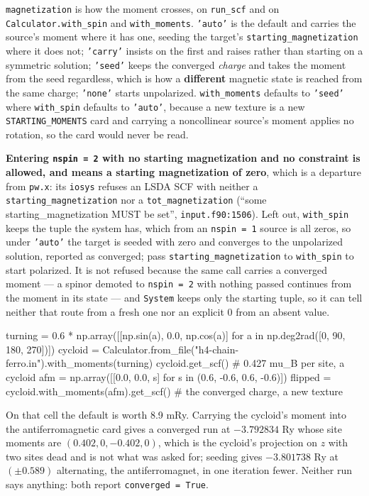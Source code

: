 \documentclass[11pt,a4paper]{article}
\newcommand{\code}[1]{\texttt{\small #1}}
\begin{document}
\code{magnetization} is how the moment crosses, on \code{run\_scf} and on
\code{Calculator.with\_spin} and \code{with\_moments}. \code{'auto'} is the
default and carries the source's moment where it has one, seeding the target's
\code{starting\_magnetization} where it does not; \code{'carry'} insists on
the first and raises rather than starting on a symmetric solution;
\code{'seed'} keeps the converged \emph{charge} and takes the moment from the
seed regardless, which is how a \textbf{different} magnetic state is reached
from the same charge; \code{'none'} starts unpolarized. \code{with\_moments}
defaults to \code{'seed'} where \code{with\_spin} defaults to \code{'auto'},
because a new texture is a new \code{STARTING\_MOMENTS} card and carrying a
noncollinear source's moment applies no rotation, so the card would never be
read.

\textbf{Entering \code{nspin = 2} with no starting magnetization and no
constraint is allowed, and means a starting magnetization of zero}, which is a
departure from \code{pw.x}: its \code{iosys} refuses an LSDA SCF with neither a
\code{starting\_magnetization} nor a \code{tot\_magnetization} (``some
starting\_magnetization MUST be set'', \code{input.f90:1506}). Left out,
\code{with\_spin} keeps the tuple the system has, which from an \code{nspin = 1}
source is all zeros, so under \code{'auto'} the target is seeded with zero and
converges to the unpolarized solution, reported as converged; pass
\code{starting\_magnetization} to \code{with\_spin} to start polarized. It is not
refused because the same call carries a converged moment --- a spinor demoted to
\code{nspin = 2} with nothing passed continues from the moment in its state ---
and \code{System} keeps only the starting tuple, so it can tell neither that
route from a fresh one nor an explicit $0$ from an absent value.

\begin{pycode}
turning = 0.6 * np.array([[np.sin(a), 0.0, np.cos(a)]
                          for a in np.deg2rad([0, 90, 180, 270])])
cycloid = Calculator.from_file("h4-chain-ferro.in").with_moments(turning)
cycloid.get_scf()                      # 0.427 mu_B per site, a cycloid
afm = np.array([[0.0, 0.0, s] for s in (0.6, -0.6, 0.6, -0.6)])
flipped = cycloid.with_moments(afm).get_scf()   # the converged charge, a new texture
\end{pycode}

On that cell the default is worth 8.9 mRy. Carrying the cycloid's moment into
the antiferromagnetic card gives a converged run at $-3.792834$ Ry whose site
moments are $(0.402, 0, -0.402, 0)$, which is the cycloid's projection on $z$
with two sites dead and is not what was asked for; seeding gives
$-3.801738$ Ry at $(\pm 0.589)$ alternating, the antiferromagnet, in one
iteration fewer. Neither run says anything: both report
\code{converged = True}.
\end{document}
